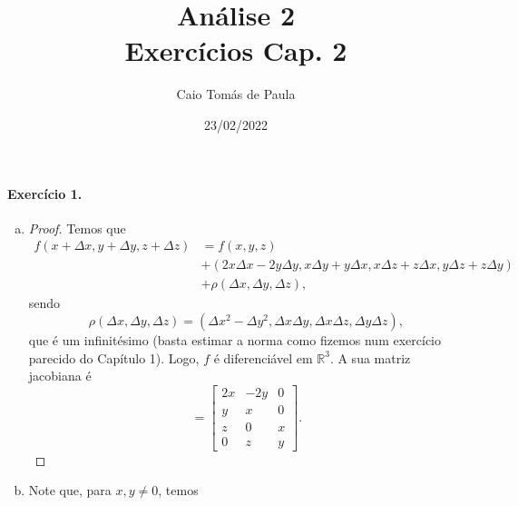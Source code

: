 \documentclass[12pt,a4paper]{article}
\title{\textbf{Análise 2}\\ Exercícios Cap. 2}
\author{Caio Tomás de Paula}
\date{23/02/2022}
\begin{document}
\maketitle

\paragraph{Exercício 1.}
%
    \begin{enumerate}[a)]
        \item
        \begin{proof}
            Temos que
            \begin{align*}
                f(x+\Delta x, y+\Delta y, z+\Delta z) &= f(x,y,z) \\
                                                      &+(2x\Delta x - 2y\Delta y, x\Delta y + y\Delta x,
                                                        x\Delta z + z\Delta x, y\Delta z + z\Delta y) \\
                                                      &+ \rho(\Delta x, \Delta y, \Delta z),
            \end{align*}
            sendo 
            \begin{equation*}
                \rho(\Delta x, \Delta y, \Delta z) = (\Delta x^2 - \Delta y^2, \Delta x\Delta y, 
                                                    \Delta x\Delta z, \Delta y\Delta z),
            \end{equation*}
            que é um infinitésimo (basta estimar a norma como fizemos num exercício parecido do Capítulo 1).
            Logo, $f$ é diferenciável em $\mathbb{R}^3$. A sua matriz jacobiana é
            \begin{equation*}
                [Df(x,y,z)] = 
                \begin{bmatrix}
                    2x & -2y & 0 \\
                    y & x & 0 \\
                    z & 0 & x \\
                    0 & z & y
                \end{bmatrix}.
            \end{equation*}
        \end{proof}
        \item Note que, para $x, y\neq 0$, temos
        \begin{align*}

\end{align*}
\end{enumerate}
\end{document}
